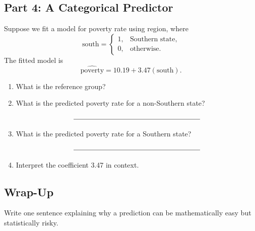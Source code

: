 \documentclass{article}
\newcommand{\blankline}[1]{\underline{\hspace{#1}}}
\begin{document}
\subsection*{Part 4: A Categorical Predictor}
Suppose we fit a model for poverty rate using region, where
\[
\text{south} =
\begin{cases}
1, & \text{Southern state},\\
0, & \text{otherwise}.
\end{cases}
\]
The fitted model is
\[
\widehat{\text{poverty}} = 10.19 + 3.47(\text{south}).
\]

\begin{enumerate}[label={\bfseries (\Alph*)},itemsep=.8em]
\item What is the reference group? \\[2.5em]
\item What is the predicted poverty rate for a non-Southern state?
\[
\blankline{2.5in}
\]
\item What is the predicted poverty rate for a Southern state?
\[
\blankline{2.5in}
\]
\item Interpret the coefficient 3.47 in context. \\[3.5em]
\end{enumerate}

\subsection*{Wrap-Up}
Write one sentence explaining why a prediction can be mathematically easy but statistically risky. \\[4em]
\end{document}

